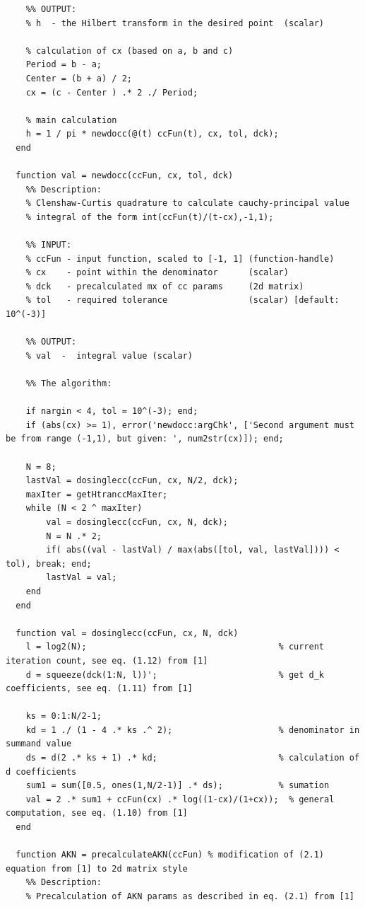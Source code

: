 \documentclass[12pt,twoside,a4paper]{article}
\numberwithin{equation}{subsection}
\numberwithin{figure}{subsection}
\begin{document}
\begin{lstlisting}
    %% OUTPUT:
    % h  - the Hilbert transform in the desired point  (scalar)

    % calculation of cx (based on a, b and c)
    Period = b - a;
    Center = (b + a) / 2;
    cx = (c - Center ) .* 2 ./ Period;

    % main calculation
    h = 1 / pi * newdocc(@(t) ccFun(t), cx, tol, dck);
  end

  function val = newdocc(ccFun, cx, tol, dck)
    %% Description: 
    % Clenshaw-Curtis quadrature to calculate cauchy-principal value
    % integral of the form int(ccFun(t)/(t-cx),-1,1);
    
    %% INPUT:
    % ccFun - input function, scaled to [-1, 1] (function-handle)
    % cx    - point within the denominator      (scalar)
    % dck   - precalculated mx of cc params     (2d matrix)
    % tol   - required tolerance                (scalar) [default: 10^(-3)]
    
    %% OUTPUT:
    % val  -  integral value (scalar)
  
    %% The algorithm:
    
    if nargin < 4, tol = 10^(-3); end;
    if (abs(cx) >= 1), error('newdocc:argChk', ['Second argument must be from range (-1,1), but given: ', num2str(cx)]); end; 
     
    N = 8;
    lastVal = dosinglecc(ccFun, cx, N/2, dck);
    maxIter = getHtranccMaxIter;
    while (N < 2 ^ maxIter)
        val = dosinglecc(ccFun, cx, N, dck); 
        N = N .* 2;
        if( abs((val - lastVal) / max(abs([tol, val, lastVal]))) < tol), break; end;
        lastVal = val;
    end
  end
    
  function val = dosinglecc(ccFun, cx, N, dck)
    l = log2(N);                                      % current iteration count, see eq. (1.12) from [1]
    d = squeeze(dck(1:N, l))';                        % get d_k coefficients, see eq. (1.11) from [1]
    
    ks = 0:1:N/2-1; 
    kd = 1 ./ (1 - 4 .* ks .^ 2);                     % denominator in summand value
    ds = d(2 .* ks + 1) .* kd;                        % calculation of d coefficients
    sum1 = sum([0.5, ones(1,N/2-1)] .* ds);           % sumation
    val = 2 .* sum1 + ccFun(cx) .* log((1-cx)/(1+cx));  % general computation, see eq. (1.10) from [1]
  end

  function AKN = precalculateAKN(ccFun) % modification of (2.1) equation from [1] to 2d matrix style
    %% Description:
    % Precalculation of AKN params as described in eq. (2.1) from [1]


\end{lstlisting}
\end{document}
